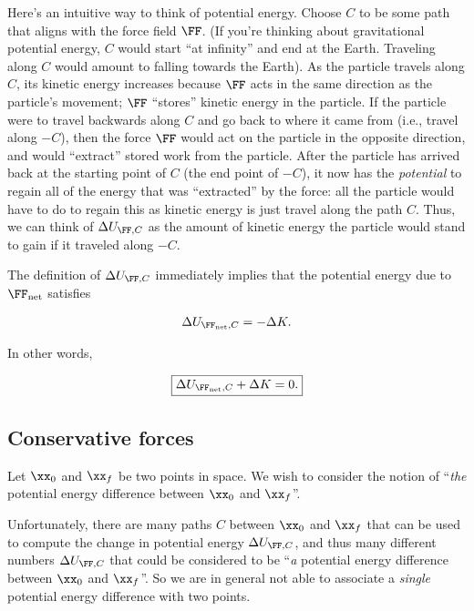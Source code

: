 \documentclass{article}
\begin{document}
Here's an intuitive way to think of potential energy. Choose $C$ to be some path that aligns with the force field $\FF$. (If you're thinking about gravitational potential energy, $C$ would start ``at infinity'' and end at the Earth. Traveling along $C$ would amount to falling towards the Earth). As the particle travels along $C$, its kinetic energy increases because $\FF$ acts in the same direction as the particle's movement; $\FF$ ``stores'' kinetic energy in the particle. If the particle were to travel backwards along $C$ and go back to where it came from (i.e., travel along $-C$), then the force $\FF$ would act on the particle in the opposite direction, and would ``extract'' stored work from the particle. After the particle has arrived back at the starting point of $C$ (the end point of $-C$), it now has the \textit{potential} to regain all of the energy that was ``extracted'' by the force: all the particle would have to do to regain this as kinetic energy is just travel along the path $C$. Thus, we can think of $\Delta U_{\FF, C}$ as the amount of kinetic energy the particle would stand to gain if it traveled along $-C$.

The definition of $\Delta U_{\FF, C}$ immediately implies that the potential energy due to $\FF_{\text{net}}$ satisfies

\begin{align*}
    \Delta U_{\FF_{\text{net}}, C} = -\Delta K.
\end{align*}

In other words,

\begin{align*}
    \boxed
    {
        \Delta U_{\FF_{\text{net}}, C} + \Delta K = 0.
    }
\end{align*}

\subsection*{Conservative forces}

Let $\xx_0$ and $\xx_f$ be two points in space. We wish to consider the notion of ``\textit{the} potential energy difference between $\xx_0$ and $\xx_f$''. 

Unfortunately, there are many paths $C$ between $\xx_0$ and $\xx_f$ that can be used to compute the change in potential energy $\Delta U_{\FF, C}$, and thus many different numbers $\Delta U_{\FF, C}$ that could be considered to be ``\textit{a} potential energy difference between $\xx_0$ and $\xx_f$''. So we are in general not able to associate a \textit{single} potential energy difference with two points.
\end{document}
